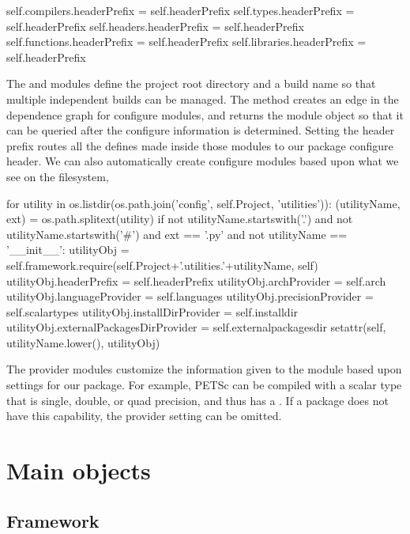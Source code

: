 {{{\begin{pythonlisting}
    self.compilers.headerPrefix  = self.headerPrefix
    self.types.headerPrefix      = self.headerPrefix
    self.headers.headerPrefix    = self.headerPrefix
    self.functions.headerPrefix  = self.headerPrefix
    self.libraries.headerPrefix  = self.headerPrefix
\end{pythonlisting}
The  and  modules define the project root directory and a build name so that multiple independent builds can be managed. The  method creates an edge in the dependence graph for configure modules, and returns the module object so that it can be queried after the configure information is determined. Setting the header prefix routes all the defines made inside those modules to our package configure header. We can also automatically create configure modules based upon what we see on the filesystem,
\begin{pythonlisting}
for utility in os.listdir(os.path.join('config', self.Project, 'utilities')):
  (utilityName, ext) = os.path.splitext(utility)
  if not utilityName.startswith('.') and not utilityName.startswith('#') and ext == '.py' and not utilityName == '__init__':
    utilityObj                    = self.framework.require(self.Project+'.utilities.'+utilityName, self)
    utilityObj.headerPrefix       = self.headerPrefix
    utilityObj.archProvider       = self.arch
    utilityObj.languageProvider   = self.languages
    utilityObj.precisionProvider  = self.scalartypes
    utilityObj.installDirProvider = self.installdir
    utilityObj.externalPackagesDirProvider = self.externalpackagesdir
    setattr(self, utilityName.lower(), utilityObj)
\end{pythonlisting}
The provider modules customize the information given to the module based upon settings for our package. For example, PETSc can be compiled with a scalar type that is single, double, or quad precision, and thus has a . If a package does not have this capability, the provider setting can be omitted.

\section{Main objects}

\subsection{Framework}

}}}
